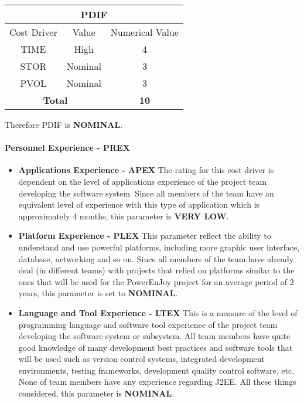 \begin{longtable}{ccc}
\multicolumn{3}{c}{\textbf{PDIF}}\\
\toprule
Cost Driver&Value&Numerical Value\\
\midrule
TIME&High&4\\
STOR&Nominal&3\\
PVOL&Nominal&3\\
\midrule
\multicolumn{2}{c}{\textbf{Total}}&\textbf{10}\\
\bottomrule
\end{longtable}

Therefore PDIF is \textbf{NOMINAL}.

\paragraph{Personnel Experience - PREX}
\begin{itemize}
	\item \textbf{Applications Experience - APEX} The rating for this cost driver is dependent on the level of applications experience of the project team developing the software system. Since all members of the team have an equivalent level of experience with this type of application which is approximately 4 months, this parameter is \textbf{VERY LOW}.
	
	\item \textbf{Platform Experience - PLEX} This parameter reflect the ability to understand and use powerful platforms, including more graphic user interface, database, networking and so on. Since all members of the team have already deal (in different teams) with projects that relied on platforms similar to the ones that will be used for the PowerEnJoy project for an average period of 2 years, this parameter is set to \textbf{NOMINAL}.
	
	\item \textbf{Language and Tool Experience - LTEX} This is a measure of the level of programming language and software tool experience of the project team developing the software system or subsystem. All team members have quite good knowledge of many development best practices and software tools that will be used such as version control systems, integrated development environments, testing frameworks, development quality control software, etc. None of team members have any experience regarding J2EE. All these things considered, this parameter is \textbf{NOMINAL}.
	
\end{itemize}

